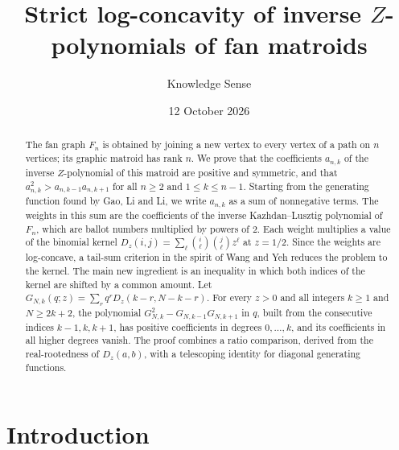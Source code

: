 \documentclass{amsart}
\theoremstyle{definition}
\theoremstyle{remark}
\numberwithin{equation}{section}
\numberwithin{table}{section}
\begin{document}
\title[Inverse $Z$-polynomials of fan matroids]{Strict log-concavity of inverse $Z$-polynomials of fan matroids}

\author{Knowledge Sense}

\date{12 October 2026}



\begin{abstract}
The fan graph $F_n$ is obtained by joining a new vertex to every vertex of a path on $n$ vertices; its graphic matroid has rank $n$. We prove that the coefficients $a_{n,k}$ of the inverse $Z$-polynomial of this matroid are positive and symmetric, and that $a_{n,k}^2>a_{n,k-1}a_{n,k+1}$ for all $n\ge 2$ and $1\le k\le n-1$. Starting from the generating function found by Gao, Li and Li, we write $a_{n,k}$ as a sum of nonnegative terms. The weights in this sum are the coefficients of the inverse Kazhdan--Lusztig polynomial of $F_n$, which are ballot numbers multiplied by powers of $2$. Each weight multiplies a value of the binomial kernel $D_z(i,j)=\sum_{\ell}\binom{i}{\ell}\binom{j}{\ell}z^{\ell}$ at $z=1/2$. Since the weights are log-concave, a tail-sum criterion in the spirit of Wang and Yeh reduces the problem to the kernel. The main new ingredient is an inequality in which both indices of the kernel are shifted by a common amount. Let $G_{N,k}(q;z)=\sum_{r}q^{r}D_z(k-r,N-k-r)$. For every $z>0$ and all integers $k\ge 1$ and $N\ge 2k+2$, the polynomial $G_{N,k}^2-G_{N,k-1}G_{N,k+1}$ in $q$, built from the consecutive indices $k-1,k,k+1$, has positive coefficients in degrees $0,\dots,k$, and its coefficients in all higher degrees vanish. The proof combines a ratio comparison, derived from the real-rootedness of $D_z(a,b)$, with a telescoping identity for diagonal generating functions.
\end{abstract}

\maketitle

\section{Introduction}
\end{document}
